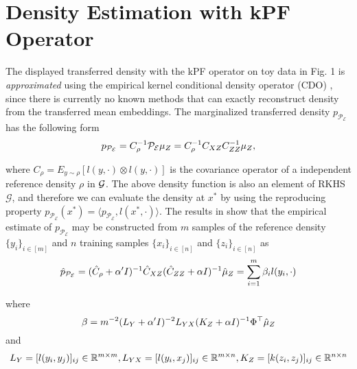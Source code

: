 \clearpage
\section{Density Estimation with kPF Operator}

The displayed transferred density with the kPF operator on toy data in Fig. 1 is \textit{approximated} using the empirical kernel conditional density operator (CDO) \citep{schuster2020kcdo}, since there is currently no known methods that can exactly reconstruct density from the transferred mean embeddings. The marginalized transferred density $p_{\mathcal{P}_\mathcal{E}}$ has the following form
\begin{equation}
p_{\mathcal{P}_\mathcal{E}} = C_\rho^{-1}\mathcal{P}_\mathcal{E}\mu_{\var{z}} = C_\rho^{-1}C_{\var{x}\var{z}}C_{\var{z}\var{z}}^{-1}\mu_{\var{z}},  
\end{equation}

where $C_\rho = E_{y \sim \rho}[l(y, \cdot) \otimes l(y, \cdot)]$ is the covariance operator of a independent reference density $\rho$ in $\mathcal{G}$. The above density function is also an element of RKHS $\mathcal{G}$, and therefore we can evaluate the density at $x^*$ by using the reproducing property $p_{\mathcal{P}_\mathcal{E}}(x^*) = \langle p_{\mathcal{P}_\mathcal{E}}, l(x^*, \cdot) \rangle$. The results in \citet{schuster2020kcdo} show that the empirical estimate of $p_{\mathcal{P}_\mathcal{E}}$ may be constructed from $m$ samples of the reference density $\{y_i\}_{i \in [m]}$ and $n$ training samples $\{x_i\}_{i \in [n]}$ and $\{z_i\}_{i \in [n]}$ as 
\begin{equation}
\label{eq:empirical_kcdo}
    \hat{p}_{\mathcal{P}_\mathcal{E}} = (\hat{C}_\rho + \alpha' I)^{-1}\hat{C}_{\var{x}\var{z}}(\hat{C}_{\var{z}\var{z}} + \alpha I)^{-1}\hat{\mu}_{\var{z}} = \sum_{i = 1}^{m} \beta_i l(y_i, \cdot)
\end{equation}

where 
\begin{equation}\beta = m^{-2}(L_{\var{y}} + \alpha'I)^{-2}L_{\var{y}\var{x}}(K_{\var{z}} + \alpha I)^{-1}\Phi^\top \hat{\mu}_{\var{z}}
\end{equation} and 
\begin{equation}
L_{\var{y}}= [l(y_i, y_j)]_{ij} \in \mathbb{R}^{m \times m} , L_{\var{y}\var{x}}= [l(y_i, x_j)]_{ij} \in \mathbb{R}^{m \times n}, K_{\var{z}}= [k(z_i, z_j)]_{ij} \in \mathbb{R}^{n \times n}
\end{equation}


